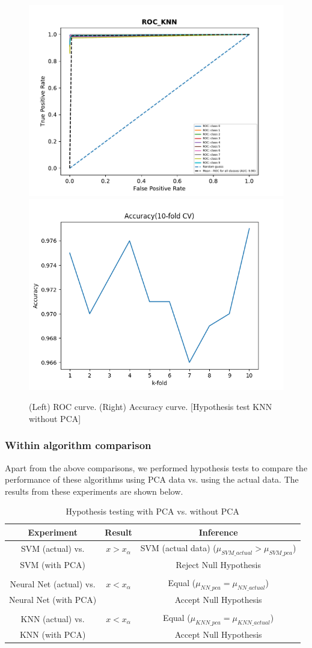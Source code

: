 \documentclass[10pt]{scrartcl}
\begin{document}
\begin{itemize}
\begin{figure}[H]
\centering
\includegraphics[width=0.45\linewidth]{figures/KNN_ROC_K_3_fold_1.pdf} 
\includegraphics[width=0.45\linewidth]{figures/accuracy_knn_without_PCA.png}
\caption{(Left) ROC curve. (Right) Accuracy curve. [Hypothesis test KNN without PCA] \label{fig:hypo_knn_roc_acc_act}}
\end{figure}

\end{itemize}

\subsubsection*{Within algorithm comparison}

Apart from the above comparisons, we performed hypothesis tests to compare the performance of these algorithms using PCA data vs. using the actual data. The results from these experiments are shown below. 

\begin{table}[H] 
\centering
\begin{tabular}{ c|c|c }
 \textbf{Experiment} & \textbf{Result} & \textbf{Inference} \\ 
 \hline
SVM (actual) vs. & $x > x_{\alpha}$ & SVM (actual data) ($\mu_{SVM\_actual} > \mu_{SVM\_pca}$) \\ 
SVM (with PCA) & & Reject Null Hypothesis \\ 
& & \\
Neural Net (actual) vs. & $x < x_{\alpha}$ &  Equal ($\mu_{NN\_pca} = \mu_{NN\_actual}$) \\
Neural Net (with PCA)  & & Accept Null Hypothesis\\ 
& & \\
KNN (actual) vs. & $x < x_{\alpha}$ &  Equal ($\mu_{KNN\_pca} = \mu_{KNN\_actual}$) \\
KNN (with PCA)  & & Accept Null Hypothesis\\ 
\end{tabular}
\caption{Hypothesis testing with PCA vs. without PCA \label{tab:hypo_pca_vs_act}}
\end{table}
 
\end{document}
